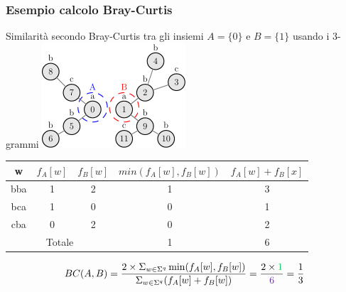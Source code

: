 \begin{frame}
	\frametitle{Esempio calcolo Bray-Curtis}
	\centering
	\small
	
	Similarità secondo Bray-Curtis tra gli insiemi $A = \{0\}$ e $B = \{1\}$ usando i $3$-grammi 
	\includegraphics[width=0.4\textwidth]{images/13_bc}
	\begin{table}[h]
	\centering
	\begin{tabular}{|c|c|c|c|c|}
		\hline
		w   & $f_A[w]$ & $f_B[w]$ & $min(f_A[w], f_B[w])$ & $f_A[w] + f_B[x]$ \\ 
		\hline
		bba & 1 & 2 & 1 & 3 \\
		\hline
		bca & 1 & 0 & 0 & 1 \\
		\hline
		cba & 0 & 2 & 0 & 2 \\
		\hline
		\multicolumn{3}{|c|}{Totale} & \color{green}1 &\color{RoyalPurple}6\color{black} \\
		\hline
	\end{tabular}
	\end{table}

	\begin{equation*}
		BC(A,B) = \frac{ 2 \times \Sigma_{w \in \Sigma^{q}} \min(f_{A}[w], f_{B}[w]) }{ \Sigma_{w \in \Sigma^{q}} (f_{A}[w] + f_{B}[w]) } = \frac{2 \times \color{green}1}{\color{RoyalPurple}6\color{black}} = \frac{1}{3}
	\end{equation*}
	
\end{frame}
